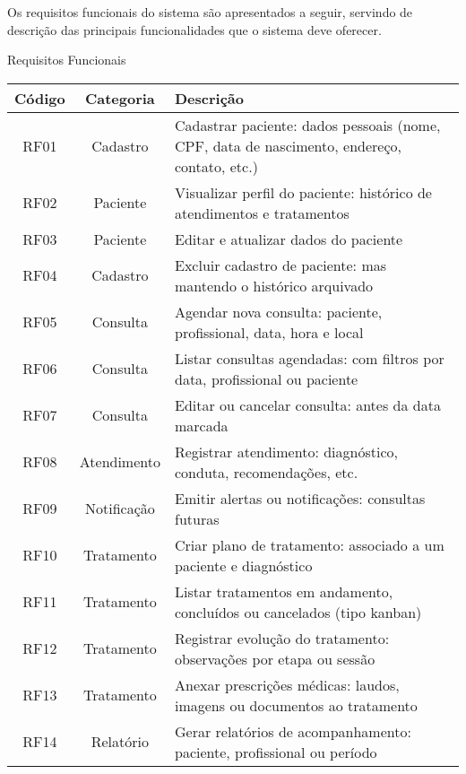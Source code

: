 Os requisitos funcionais do sistema são apresentados a seguir, servindo de descrição das principais funcionalidades que o sistema deve oferecer.

\renewcommand{\arraystretch}{1.5} %

\begin{quadro}
    \caption{\label{quadro_requisitos_f}Requisitos Funcionais}
    \begin{tabular}{|c|c|p{10cm}|}
        \hline
        \textbf{Código} & \textbf{Categoria} & \textbf{Descrição} \\ \hline
        RF01   & Cadastro     & Cadastrar paciente: dados pessoais (nome, CPF, data de nascimento, endereço, contato, etc.) \\ \hline
        RF02   & Paciente     & Visualizar perfil do paciente: histórico de atendimentos e tratamentos \\ \hline
        RF03   & Paciente     & Editar e atualizar dados do paciente \\ \hline
        RF04   & Cadastro     & Excluir cadastro de paciente: mas mantendo o histórico arquivado \\ \hline
        RF05   & Consulta     & Agendar nova consulta: paciente, profissional, data, hora e local \\ \hline
        RF06   & Consulta     & Listar consultas agendadas: com filtros por data, profissional ou paciente \\ \hline
        RF07   & Consulta     & Editar ou cancelar consulta: antes da data marcada \\ \hline
        RF08   & Atendimento  & Registrar atendimento: diagnóstico, conduta, recomendações, etc. \\ \hline
        RF09   & Notificação  & Emitir alertas ou notificações: consultas futuras \\ \hline
        RF10   & Tratamento   & Criar plano de tratamento: associado a um paciente e diagnóstico \\ \hline
        RF11   & Tratamento   & Listar tratamentos em andamento, concluídos ou cancelados (tipo kanban) \\ \hline
        RF12   & Tratamento   & Registrar evolução do tratamento: observações por etapa ou sessão \\ \hline
        RF13   & Tratamento   & Anexar prescrições médicas: laudos, imagens ou documentos ao tratamento \\ \hline
        RF14   & Relatório    & Gerar relatórios de acompanhamento: paciente, profissional ou período \\ \hline

\end{tabular}
\end{quadro}
